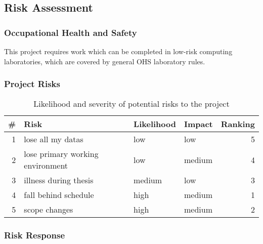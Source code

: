 \documentclass[pdftex,12pt,a4paper]{article}
\begin{document}
\subsection{Risk Assessment}
\subsubsection{Occupational Health and Safety}
This project requires work which can be completed in low-risk computing laboratories, which are covered by general OHS laboratory rules.

\subsubsection{Project Risks}

\begin{table}[H]
	\begin{center}
		\begin{tabular}{@{}rlllr@{}}
			\toprule
			\# & Risk & Likelihood & Impact & Ranking \\
			\midrule
			1 & lose all my datas & low & low & 5 \\
			2 & lose primary working environment & low & medium & 4 \\
			3 & illness during thesis & medium & low & 3 \\
			4 & fall behind schedule & high & medium & 1 \\
			5 & scope changes & high & medium & 2 \\
			\bottomrule
		\end{tabular}
		\caption{Likelihood and severity of potential risks to the project}
	\end{center}
\end{table}

\subsubsection{Risk Response}
\end{document}
